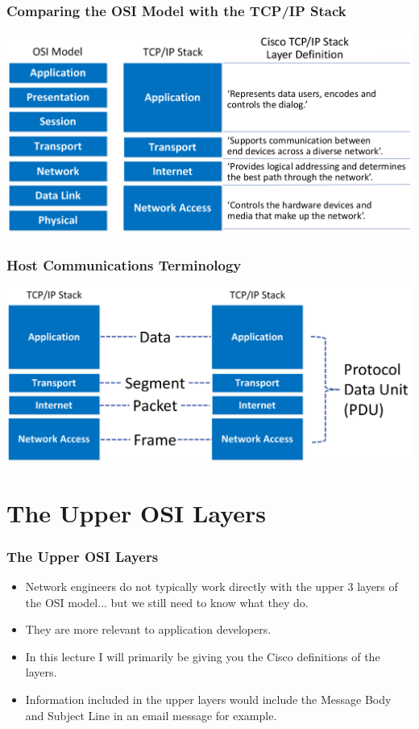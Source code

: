 \documentclass[pdflatex,compress]{beamer}
\begin{document}
\begin{frame}
	\frametitle{Comparing the OSI Model with the TCP/IP Stack}
	\begin{center}
		\includegraphics[width=\linewidth]{img/img17}
	\end{center}
\end{frame}

\begin{frame}
	\frametitle{Host Communications Terminology}
	\begin{center}
		\includegraphics[width=\linewidth]{img/img18}
	\end{center}
\end{frame}

\section{The Upper OSI Layers}

\begin{frame}
	\frametitle{The Upper OSI Layers}
	\begin{itemize}
		\item Network engineers do not typically work directly with the upper 3 layers of the OSI model... but we still need to know what they do.
		\item They are more relevant to application developers.
		\item In this lecture I will primarily be giving you the Cisco definitions of the layers.
		\item Information included in the upper layers would include the Message Body and Subject Line in an email message for example.
	\end{itemize}
\end{frame}
\end{document}
